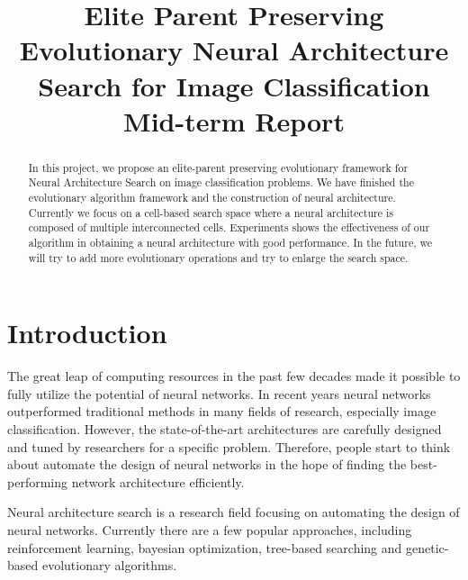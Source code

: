 \documentclass[conference]{IEEEtran}
\begin{document}
  
  \title{Elite Parent Preserving Evolutionary Neural Architecture Search for Image Classification \\ Mid-term Report}
  
  \author{
  }
  
  \maketitle
  
  \begin{abstract}
  In this project, we propose an elite-parent preserving evolutionary framework for Neural Architecture Search on image classification problems. We have finished the evolutionary algorithm framework and the construction of neural architecture. Currently we focus on a cell-based search space where a neural architecture is composed of multiple interconnected cells. Experiments shows the effectiveness of our algorithm in obtaining a neural architecture with good performance. In the future, we will try to add more evolutionary operations and try to enlarge the search space.
  \end{abstract}
  \IEEEpeerreviewmaketitle
  
  \section{Introduction}
      The great leap of computing resources in the past few decades made it possible to fully utilize the potential of neural networks. In recent years neural networks outperformed traditional methods in many fields of research, especially image classification. However, the state-of-the-art architectures are carefully designed and tuned by researchers for a specific problem. Therefore, people start to think about automate the design of neural networks in the hope of finding the best-performing network architecture efficiently.

      Neural architecture search is a research field focusing on automating the design of neural networks. Currently there are a few popular approaches, including reinforcement learning, bayesian optimization, tree-based searching and genetic-based evolutionary algorithms. 
\end{document}
